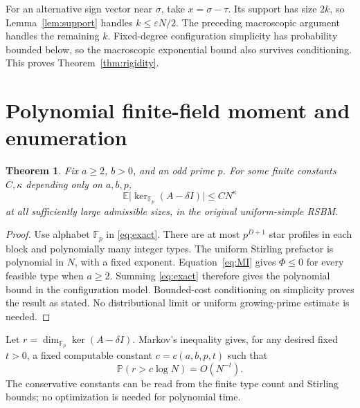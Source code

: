 \documentclass[11pt]{article}
\newtheorem{theorem}{Theorem}
\newcommand{\Prob}{\mathbb P}
\newcommand{\E}{\mathbb E}
\newcommand{\Fp}{\mathbb F_p}
\begin{document}
For an alternative sign vector near $\sigma$, take $x=\sigma-\tau$. Its support has size $2k$, so Lemma~\ref{lem:support} handles $k\le\varepsilon N/2$. The preceding macroscopic argument handles the remaining $k$. Fixed-degree configuration simplicity has probability bounded below, so the macroscopic exponential bound also survives conditioning. This proves Theorem~\ref{thm:rigidity}.

\section{Polynomial finite-field moment and enumeration}
\begin{theorem}\label{thm:polymoment}
Fix $a\ge2$, $b>0$, and an odd prime $p$. For some finite constants $C,\kappa$ depending only on $a,b,p$,
\[
 \E\bigl|\ker_{\Fp}(A-\delta I)\bigr|\le C N^\kappa
\]
at all sufficiently large admissible sizes, in the original uniform-simple RSBM.
\end{theorem}
\begin{proof}
Use alphabet $\Fp$ in \eqref{eq:exact}. There are at most $p^{D+1}$ star profiles in each block and polynomially many integer types. The uniform Stirling prefactor is polynomial in $N$, with a fixed exponent. Equation~\eqref{eq:MI} gives $\Phi\le0$ for every feasible type when $a\ge2$. Summing \eqref{eq:exact} therefore gives the polynomial bound in the configuration model. Bounded-cost conditioning on simplicity proves the result as stated. No distributional limit or uniform growing-prime estimate is needed.
\end{proof}

Let $r=\dim_{\Fp}\ker(A-\delta I)$. Markov's inequality gives, for any desired fixed $t>0$, a fixed computable constant $c=c(a,b,p,t)$ such that
\[
 \Prob(r>c\log N)=O(N^{-t}).
\]
The conservative constants can be read from the finite type count and Stirling bounds; no optimization is needed for polynomial time.
\end{document}
